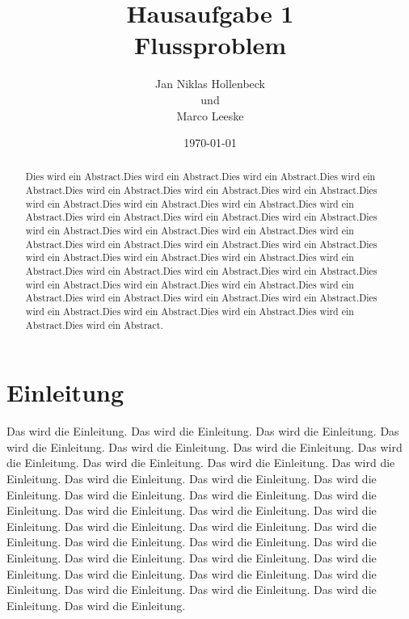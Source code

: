 \documentclass[11pt]{article}
\title{Hausaufgabe 1 \\ Flussproblem}
\author{Jan Niklas Hollenbeck \\ und \\ Marco Leeske}
\date{\today}
\begin{document}
\maketitle

\newpage

\begin{abstract}

Dies wird ein Abstract.Dies wird ein Abstract.Dies wird ein Abstract.Dies wird ein Abstract.Dies wird ein Abstract.Dies wird ein Abstract.Dies wird ein Abstract.Dies wird ein Abstract.Dies wird ein Abstract.Dies wird ein Abstract.Dies wird ein Abstract.Dies wird ein Abstract.Dies wird ein Abstract.Dies wird ein Abstract.Dies wird ein Abstract.Dies wird ein Abstract.Dies wird ein Abstract.Dies wird ein Abstract.Dies wird ein Abstract.Dies wird ein Abstract.Dies wird ein Abstract.Dies wird ein Abstract.Dies wird ein Abstract.Dies wird ein Abstract.Dies wird ein Abstract.Dies wird ein Abstract.Dies wird ein Abstract.Dies wird ein Abstract.Dies wird ein Abstract.Dies wird ein Abstract.Dies wird ein Abstract.Dies wird ein Abstract.Dies wird ein Abstract.Dies wird ein Abstract.Dies wird ein Abstract.Dies wird ein Abstract.Dies wird ein Abstract.Dies wird ein Abstract.Dies wird ein Abstract.Dies wird ein Abstract. 

\end{abstract}


\section{Einleitung}
\label{Einleitung}

Das wird die Einleitung. Das wird die Einleitung. Das wird die Einleitung. Das wird die Einleitung. Das wird die Einleitung. Das wird die Einleitung. Das wird die Einleitung. Das wird die Einleitung. Das wird die Einleitung. Das wird die Einleitung. Das wird die Einleitung. Das wird die Einleitung. Das wird die Einleitung. Das wird die Einleitung. Das wird die Einleitung. Das wird die Einleitung. Das wird die Einleitung. Das wird die Einleitung. Das wird die Einleitung. Das wird die Einleitung. Das wird die Einleitung. Das wird die Einleitung. Das wird die Einleitung. Das wird die Einleitung. Das wird die Einleitung. Das wird die Einleitung. Das wird die Einleitung. Das wird die Einleitung. Das wird die Einleitung. Das wird die Einleitung. Das wird die Einleitung. Das wird die Einleitung. Das wird die Einleitung. Das wird die Einleitung. Das wird die Einleitung. 

\end{document}
